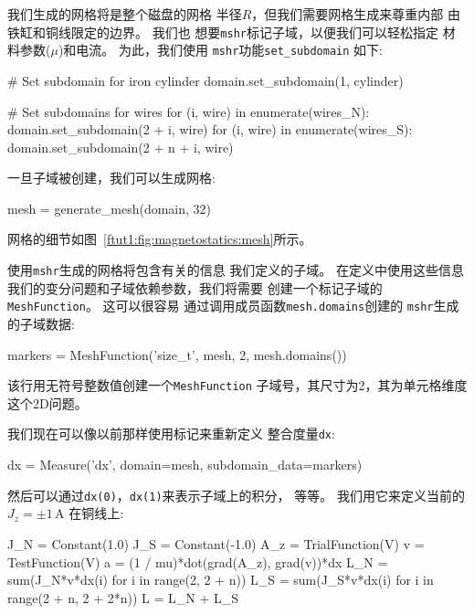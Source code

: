 我们生成的网格将是整个磁盘的网格
半径$R$，但我们需要网格生成来尊重内部
由铁缸和铜线限定的边界。 我们也
想要\texttt{mshr}标记子域，以便我们可以轻松指定
材料参数($\mu$)和电流。 为此，我们使用
\texttt{mshr}功能\verb!set_subdomain! 如下:

\begin{python}
# Set subdomain for iron cylinder
domain.set_subdomain(1, cylinder)

# Set subdomains for wires
for (i, wire) in enumerate(wires_N):
    domain.set_subdomain(2 + i, wire)
for (i, wire) in enumerate(wires_S):
    domain.set_subdomain(2 + n + i, wire)
\end{python}
一旦子域被创建，我们可以生成网格:

\begin{python}
mesh = generate_mesh(domain, 32)
\end{python}
网格的细节如图~\ref{ftut1:fig:magnetostatics:mesh}所示。


使用\texttt{mshr}生成的网格将包含有关的信息
我们定义的子域。 在定义中使用这些信息
我们的变分问题和子域依赖参数，我们将需要
创建一个标记子域的\texttt{MeshFunction}。 这可以很容易
通过调用成员函数\texttt{mesh.domains}创建的
\texttt{mshr}生成的子域数据:

\begin{python}
markers = MeshFunction('size_t', mesh, 2, mesh.domains())
\end{python}
该行用无符号整数值创建一个\texttt{MeshFunction}
子域号，其尺寸为2，其为单元格维度
这个2D问题。

我们现在可以像以前那样使用标记来重新定义
整合度量\texttt{dx}:


\begin{python}
dx = Measure('dx', domain=mesh, subdomain_data=markers)
\end{python}
然后可以通过\texttt{dx(0)}，\texttt{dx(1)}来表示子域上的积分，
等等。 我们用它来定义当前的$J_z = \pm 1\,\mathrm{A}$
在铜线上:

\begin{python}
J_N = Constant(1.0)
J_S = Constant(-1.0)
A_z = TrialFunction(V)
v = TestFunction(V)
a = (1 / mu)*dot(grad(A_z), grad(v))*dx
L_N = sum(J_N*v*dx(i) for i in range(2, 2 + n))
L_S = sum(J_S*v*dx(i) for i in range(2 + n, 2 + 2*n))
L = L_N + L_S
\end{python}

